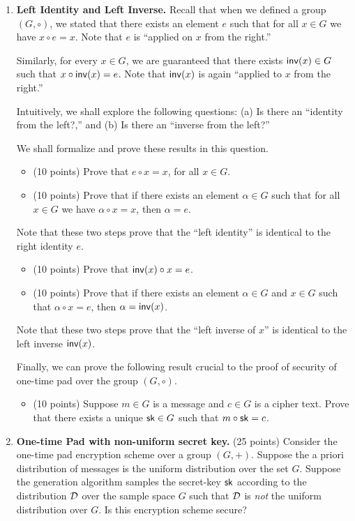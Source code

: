 \documentclass[11pt]{article}
\newcommand{\nextoddpage}{\checkoddpage\ifoddpage{\ \newpage\ \newpage}\else{\ \newpage}\fi}
\begin{document}
\begin{enumerate}
  
\nextoddpage 
\item {\bfseries Left Identity and Left Inverse.} 
  Recall that when we defined a group $(G,\circ)$, we stated that there exists an element $e$ such that for all $x\in G$ we have $x\circ e=x$. 
  Note that $e$ is ``applied on $x$ from the right.'' 
  
  Similarly, for every $x\in G$, we are guaranteed that there exists $\mathsf{inv}(x)\in G$ such that $x\circ\mathsf{inv}(x)=e$. 
  Note that $\mathsf{inv}(x)$ is again ``applied to $x$ from the right.'' 
  
  Intuitively, we shall explore the following questions: (a) Is there an ``identity from the left?,'' and (b) Is there an ``inverse from the left?'' 
  
  We shall formalize and prove these results in this question. 
  \begin{itemize}
  \item (10 points) Prove that $e\circ x = x$, for all $x\in G$. 
  \item (10 points) Prove that if there exists an element $\alpha\in G$ such that for all $x\in G$ we have $\alpha\circ x=x$, then $\alpha = e$. 
  \end{itemize}
  Note that these two steps prove that the ``left identity'' is identical to the right identity $e$. 
  
  
  \begin{itemize}
  \item (10 points) Prove that $\mathsf{inv}(x)\circ x = e$. 
  \item (10 points) Prove that if there exists an element $\alpha\in G$ and $x\in G$ such that $\alpha\circ x=e$, then $\alpha=\mathsf{inv}(x)$. 
  \end{itemize}
  Note that these two steps prove that the ``left inverse of $x$'' is identical to the left inverse $\mathsf{inv}(x)$. 
  
  Finally, we can prove the following result crucial to the proof of security of one-time pad over the group $(G,\circ)$. 
  \begin{itemize}
  \item (10 points) Suppose $m\in G $ is a message and $c\in G$ is a cipher text. 
    Prove that there exists a unique $\mathsf{sk}\in G$ such that $m\circ \mathsf{sk} = c$. 
  \end{itemize}  

\nextoddpage 
\item {\bfseries One-time Pad with non-uniform secret key.} 
  (25 points) Consider the one-time pad encryption scheme over a group $(G,+)$. 
  Suppose the a priori distribution of messages is the uniform distribution over the set $G$. 
  Suppose the generation algorithm samples the secret-key $\mathsf{sk}$ according to the distribution ${\mathcal D}$ over the sample space $G$ such that ${\mathcal D}$ is {\em not} the uniform distribution over $G$. 
  Is this encryption scheme secure? 
  

\end{enumerate}
\end{document}

